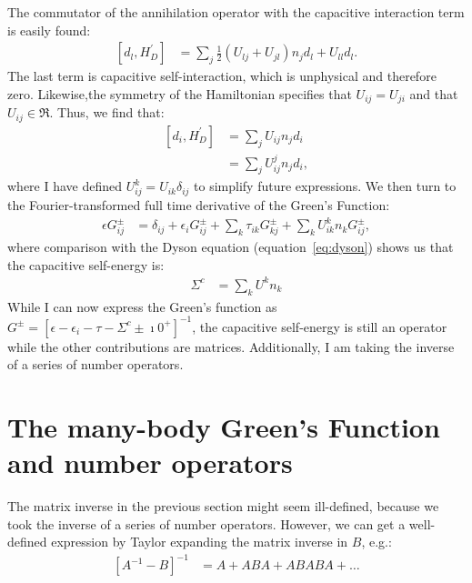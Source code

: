 The commutator of the annihilation operator with the capacitive interaction term is easily found:
\begin{align*}
\left[ d_l, H^\prime_D\right] &= \sum_{j} \frac{1}{2} \left( U_{lj} + U_{jl}\right) n_j d_l + U_{ll} d_l.
\end{align*}
The last term is capacitive self-interaction, which is unphysical and therefore zero. Likewise,the symmetry of the Hamiltonian specifies that $U_{ij} = U_{ji}$ and that $U_{ij} \in \Re$. Thus, we find that:
\begin{align*}
\left[ d_i, H^\prime_D\right] &=  \sum_{j}U_{ij} n_j d_i \\
&= \sum_j U^j_{ij} n_j d_i,
\end{align*}
where I have defined $U^k_{ij} = U_{ik} \delta_{ij}$ to simplify future expressions. We then turn to the Fourier-transformed full time derivative of the Green's Function:
\begin{align*}
\epsilon G_{ij}^\pm &= \delta_{ij} + \epsilon_i G_{ij}^\pm + \sum_k \tau_{ik} G_{kj}^\pm + \sum_k U^k_{ik} n_k G_{ij}^\pm,
\end{align*}
where comparison with the Dyson equation (equation~\ref{eq:dyson}) shows us that the capacitive self-energy is:
\begin{align}
\Sigma^{c} &= \sum_k U^k n_k
\label{eq:selfenergycapacitive}
\end{align}While I can now express the Green's function as $G^\pm = \left[ \epsilon - \epsilon_i - \tau - \Sigma^c \pm \imath 0^+\right]^{-1}$, the capacitive self-energy is still an operator while the other contributions are matrices. Additionally, I am taking the inverse of a series of number operators. 

\section{The many-body Green's Function and number operators}
\label{sec:mbgfno}
The matrix inverse in the previous section might seem ill-defined, because we took the inverse of a series of number operators. However, we can get a well-defined expression by Taylor expanding the matrix inverse in $B$, e.g.:
\begin{align}
\left[ A^{-1} - B\right]^{-1} &= A + ABA + ABABA + \ldots
\label{eq:inversionexpansion}
\end{align}

